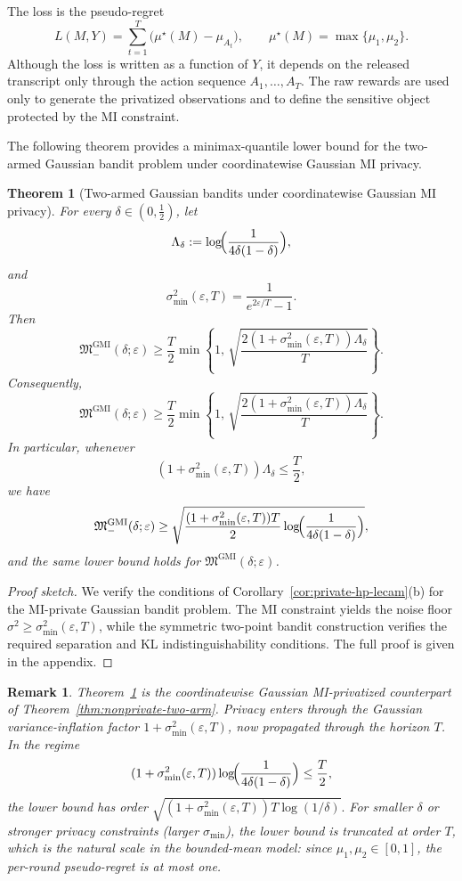 \documentclass[journal]{IEEEtran}
\newtheorem{theorem}{Theorem}
\newtheorem{remark}{Remark}
\begin{document}
The loss is the pseudo-regret
\[
L(M,Y)
=
\sum_{t=1}^T \bigl(\mu^\star(M)-\mu_{A_t}\bigr),
\qquad
\mu^\star(M)=\max\{\mu_1,\mu_2\}.
\]
Although the loss is written as a function of \(Y\), it depends on the released
transcript only through the action sequence \(A_1,\dots,A_T\). The raw rewards
are used only to generate the privatized observations and to define the
sensitive object protected by the MI constraint.

The following theorem provides a minimax-quantile lower bound for the
two-armed Gaussian bandit problem under coordinatewise Gaussian
MI privacy.
\begin{theorem}[Two-armed Gaussian bandits under coordinatewise Gaussian MI privacy]
\label{thm:private-bandit}
For every \(\delta\in(0,\tfrac12)\), let
\[
\Lambda_\delta
:=
\log\!\Bigl(\frac{1}{4\delta(1-\delta)}\Bigr),
\]
and
\[
\sigma_{\min}^2(\varepsilon,T)
=
\frac{1}{e^{2\varepsilon/T}-1}.
\]
Then
\[
\mathfrak M^{\mathrm{GMI}}_-(\delta;\varepsilon)
\ge
\frac{T}{2}
\min\!\left\{
1,\,
\sqrt{
\frac{2(1+\sigma_{\min}^2(\varepsilon,T))\Lambda_\delta}{T}
}
\right\}.
\]
Consequently,
\[
\mathfrak M^{\mathrm{GMI}}(\delta;\varepsilon)
\ge
\frac{T}{2}
\min\!\left\{
1,\,
\sqrt{
\frac{2(1+\sigma_{\min}^2(\varepsilon,T))\Lambda_\delta}{T}
}
\right\}.
\]
In particular, whenever
\[
(1+\sigma_{\min}^2(\varepsilon,T))\Lambda_\delta\le \frac{T}{2},
\]
we have
\[
\mathfrak M^{\mathrm{GMI}}_-(\delta;\varepsilon)
\ge
\sqrt{
\frac{(1+\sigma_{\min}^2(\varepsilon,T))T}{2}
\log\!\Bigl(\frac{1}{4\delta(1-\delta)}\Bigr)
},
\]
and the same lower bound holds for \(\mathfrak M^{\mathrm{GMI}}(\delta;\varepsilon)\).
\end{theorem}
\begin{proof}[Proof sketch]
We verify the conditions of Corollary~\ref{cor:private-hp-lecam}(b) for the
MI-private Gaussian bandit problem. The MI constraint yields the noise floor
\(\sigma^2\ge \sigma_{\min}^2(\varepsilon,T)\), while the symmetric two-point
bandit construction verifies the required separation and KL
indistinguishability conditions. The full proof is given in the appendix.
\end{proof}

\begin{remark}
   Theorem~\ref{thm:private-bandit} is the coordinatewise Gaussian MI-privatized counterpart of
Theorem~\ref{thm:nonprivate-two-arm}. Privacy enters through the Gaussian
variance-inflation factor \(1+\sigma_{\min}^2(\varepsilon,T)\), now propagated
through the horizon \(T\). In the regime
\[
(1+\sigma_{\min}^2(\varepsilon,T))
\log\!\Bigl(\frac{1}{4\delta(1-\delta)}\Bigr)
\le \frac{T}{2},
\]
the lower bound has order
\(
\sqrt{
(1+\sigma_{\min}^2(\varepsilon,T))T\log(1/\delta)
}.
\)
For smaller \(\delta\) or stronger privacy constraints (larger \(\sigma_{\min}\)), the lower bound
is truncated at order \(T\), which is the natural scale in the bounded-mean
model: since \(\mu_1,\mu_2\in[0,1]\), the per-round pseudo-regret is at most one. 
\end{remark}
\end{document}
